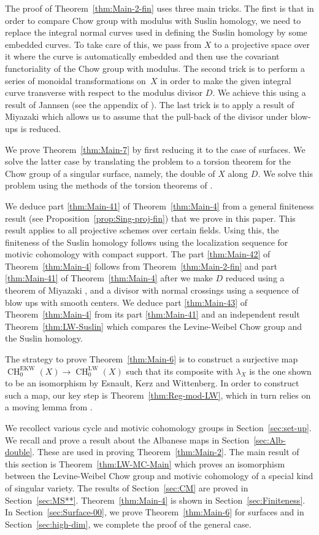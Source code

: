 \documentclass[JEP,XML,SOM,Unicode,published]{cedram}
\newcommand{\EKW}{\mathrm{EKW}}
\newcommand{\LW}{\mathrm{LW}}
\theoremstyle{definition}
\newcommand{\thmref}{Theorem~\ref}
\newcommand{\propref}{Proposition~\ref}
\newcommand{\secref}{Section~\ref}
\DeclareMathOperator{\CH}{CH}
\begin{document}
The proof of \thmref{thm:Main-2-fin} uses three main tricks. The first is
that in order to compare Chow group with modulus with Suslin homology,
we need to replace the integral normal curves used in defining the
Suslin homology by some embedded curves. To take care of this,
we pass from $X$ to a projective space over it where the curve is automatically
embedded and then use the covariant functoriality of the Chow group with
modulus. The second trick is to perform a series of monoidal transformations on~$X$ in order to make the given integral curve transverse with respect to
the modulus divisor $D$. We achieve this using a result of
Jannsen (see the appendix of \cite{SaitoSatoAnnals}).
The last trick is to apply a result of Miyazaki \cite{Miyazaki}
which allows us to assume that the pull-back of the divisor under blow-ups is reduced.

We prove \thmref{thm:Main-7} by first reducing it to the case of surfaces.
We solve the latter case by translating the problem to a
torsion theorem for the Chow group of a singular surface, namely, the double of
$X$ along $D$. We solve this problem using the methods of the torsion theorems
of \cite{Krishna-2}.

We deduce part \eqref{thm:Main-41} of \thmref{thm:Main-4} from a general finiteness result
(see \propref{prop:Sing-proj-fin}) that we prove in this paper.
This result applies to all projective schemes over certain fields.
Using this, the finiteness of the Suslin homology follows using the
localization sequence for motivic cohomology with compact support.
The part \eqref{thm:Main-42} of \thmref{thm:Main-4} follows from
\thmref{thm:Main-2-fin} and part \eqref{thm:Main-41} of \thmref{thm:Main-4} after we make
$D$ reduced using a theorem of Miyazaki \cite{Miyazaki}, and a divisor with
normal crossings using a sequence of blow ups with smooth centers.
We deduce part \eqref{thm:Main-43} of \thmref{thm:Main-4} from its part \eqref{thm:Main-41} and
an independent result \thmref{thm:LW-Suslin} which compares the Levine-Weibel
Chow group and the Suslin homology.

The strategy to prove \thmref{thm:Main-6} is to construct a surjective map
$\CH^{\EKW}_0(X) \to \CH^{\LW}_0(X)$ such that its composite with
$\lambda_X$ is the one shown to be an isomorphism by Esnault, Kerz and
Wittenberg. In order to construct such a map, our key step is
\thmref{thm:Reg-mod-LW}, which in turn relies on a moving lemma from
\cite{BK}.

We recollect various cycle and motivic cohomology groups in
\secref{sec:set-up}. We recall and prove a result about the
Albanese maps in \secref{sec:Alb-double}. These are used in
proving \thmref{thm:Main-2}. The main result of this section is
\thmref{thm:LW-MC-Main} which proves an isomorphism between
the Levine-Weibel Chow group and motivic cohomology of a
special kind of singular variety.
The results of \secref{sec:CM} are proved in
\secref{sec:MS**}. \thmref{thm:Main-4} is shown in \secref{sec:Finiteness}.
In \secref{sec:Surface-00}, we prove
\thmref{thm:Main-6} for surfaces and in \secref{sec:high-dim},
we complete the proof of the general case.
\end{document}
